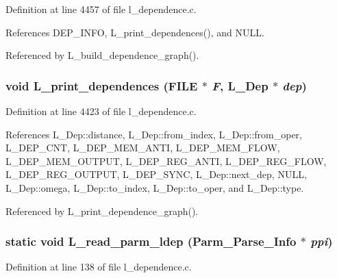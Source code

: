 Definition at line 4457 of file l\_\-dependence.c.

References DEP\_\-INFO, L\_\-print\_\-dependences(), and NULL.

Referenced by L\_\-build\_\-dependence\_\-graph().
\subsubsection{\setlength{\rightskip}{0pt plus 5cm}void L\_\-print\_\-dependences (FILE $\ast$ {\em F}, \bf{L\_\-Dep} $\ast$ {\em dep})}\label{l__dependence_8c_86ca16e95abb5f67556626e04e57d5ea}




Definition at line 4423 of file l\_\-dependence.c.

References L\_\-Dep::distance, L\_\-Dep::from\_\-index, L\_\-Dep::from\_\-oper, L\_\-DEP\_\-CNT, L\_\-DEP\_\-MEM\_\-ANTI, L\_\-DEP\_\-MEM\_\-FLOW, L\_\-DEP\_\-MEM\_\-OUTPUT, L\_\-DEP\_\-REG\_\-ANTI, L\_\-DEP\_\-REG\_\-FLOW, L\_\-DEP\_\-REG\_\-OUTPUT, L\_\-DEP\_\-SYNC, L\_\-Dep::next\_\-dep, NULL, L\_\-Dep::omega, L\_\-Dep::to\_\-index, L\_\-Dep::to\_\-oper, and L\_\-Dep::type.

Referenced by L\_\-print\_\-dependence\_\-graph().
\subsubsection{\setlength{\rightskip}{0pt plus 5cm}static void L\_\-read\_\-parm\_\-ldep (\bf{Parm\_\-Parse\_\-Info} $\ast$ {\em ppi})\hspace{0.3cm}{\tt  [static]}}\label{l__dependence_8c_935fc35d7f7e8ebcf966ab4053168aa3}




Definition at line 138 of file l\_\-dependence.c.

